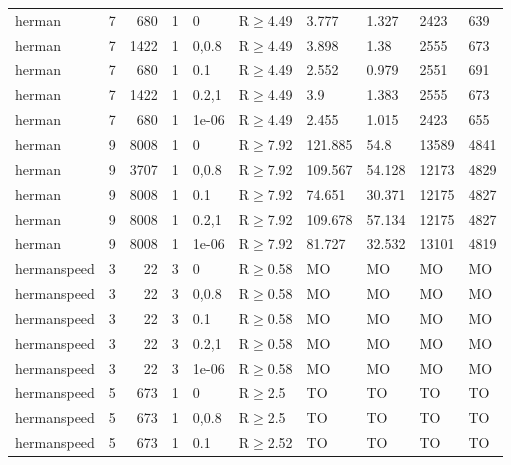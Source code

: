 \begin{longtable}{llrrllllll}
 herman        & 7        &    	680 &   1 & 0     & R$\geq$4.49  & 3.777    & 1.327    & 2423    & 639     \\
 herman        & 7        &   	1422 &   1 & 0,0.8 & R$\geq$4.49  & 3.898    & 1.38     & 2555    & 673     \\
 herman        & 7        &    	680 &   1 & 0.1   & R$\geq$4.49  & 2.552    & 0.979    & 2551    & 691     \\
 herman        & 7        &   	1422 &   1 & 0.2,1 & R$\geq$4.49  & 3.9      & 1.383    & 2555    & 673     \\
 herman        & 7        &    	680 &   1 & 1e-06 & R$\geq$4.49  & 2.455    & 1.015    & 2423    & 655     \\
 herman        & 9        &   	8008 &   1 & 0     & R$\geq$7.92  & 121.885  & 54.8     & 13589   & 4841    \\
 herman        & 9        &   	3707 &   1 & 0,0.8 & R$\geq$7.92  & 109.567  & 54.128   & 12173   & 4829    \\
 herman        & 9        &   	8008 &   1 & 0.1   & R$\geq$7.92  & 74.651   & 30.371   & 12175   & 4827    \\
 herman        & 9        &   	8008 &   1 & 0.2,1 & R$\geq$7.92  & 109.678  & 57.134   & 12175   & 4827    \\
 herman        & 9        &   	8008 &   1 & 1e-06 & R$\geq$7.92  & 81.727   & 32.532   & 13101   & 4819    \\
 hermanspeed   & 3        &     	22 &   3 & 0     & R$\geq$0.58  & MO       & MO       & MO      & MO      \\
 hermanspeed   & 3        &     	22 &   3 & 0,0.8 & R$\geq$0.58  & MO       & MO       & MO      & MO      \\
 hermanspeed   & 3        &     	22 &   3 & 0.1   & R$\geq$0.58  & MO       & MO       & MO      & MO      \\
 hermanspeed   & 3        &     	22 &   3 & 0.2,1 & R$\geq$0.58  & MO       & MO       & MO      & MO      \\
 hermanspeed   & 3        &     	22 &   3 & 1e-06 & R$\geq$0.58  & MO       & MO       & MO      & MO      \\
 hermanspeed   & 5        &    	673 &   1 & 0     & R$\geq$2.5   & TO       & TO       & TO      & TO      \\
 hermanspeed   & 5        &    	673 &   1 & 0,0.8 & R$\geq$2.5   & TO       & TO       & TO      & TO      \\
 hermanspeed   & 5        &    	673 &   1 & 0.1   & R$\geq$2.52  & TO       & TO       & TO      & TO      \\

\end{longtable}
